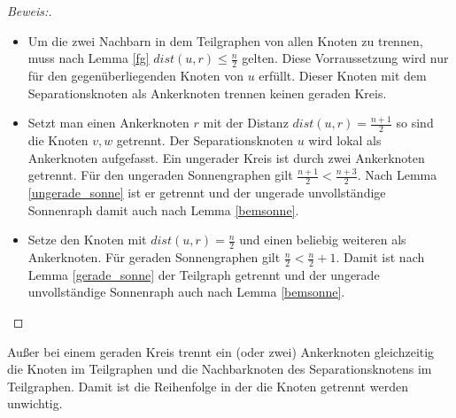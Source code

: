 \begin{proof}[Beweis:]
\begin{itemize}
\item Um die zwei Nachbarn in dem Teilgraphen von allen Knoten zu trennen, muss nach Lemma \ref{fg} $dist(u,r)\leq \frac{n}{2}$ gelten. Diese Vorraussetzung wird nur für den gegenüberliegenden Knoten von $u$ erfüllt. Dieser Knoten mit dem Separationsknoten als Ankerknoten trennen keinen geraden Kreis.
\item  Setzt man einen Ankerknoten $r$ mit der Distanz $dist(u,r)= \frac{n+1}{2}$ so sind die Knoten $v,w$ getrennt. Der Separationsknoten $u$ wird lokal als Ankerknoten aufgefasst. Ein ungerader Kreis ist durch zwei Ankerknoten getrennt. Für den ungeraden Sonnengraphen gilt $\frac{n+1}{2}< \frac{n+3}{2}$. Nach Lemma \ref{ungerade_sonne} ist er getrennt und der ungerade unvollständige Sonnenraph damit auch nach Lemma \ref{bemsonne}.
\item Setze den Knoten mit $dist(u,r)= \frac{n}{2}$ und einen beliebig weiteren als Ankerknoten. Für geraden Sonnengraphen gilt $\frac{n}{2}< \frac{n}{2}+1$. Damit ist nach Lemma \ref{gerade_sonne} der Teilgraph getrennt und der ungerade unvollständige Sonnenraph auch nach Lemma \ref{bemsonne}.
\end{itemize}
\vspace{-2mm}
\end{proof}
\vspace{-3mm}
Außer bei einem geraden Kreis trennt ein (oder zwei) Ankerknoten gleichzeitig die Knoten im Teilgraphen und die Nachbarknoten des Separationsknotens im Teilgraphen. Damit ist die Reihenfolge in der die Knoten getrennt werden unwichtig.
\newpage
\vspace{-2mm}
